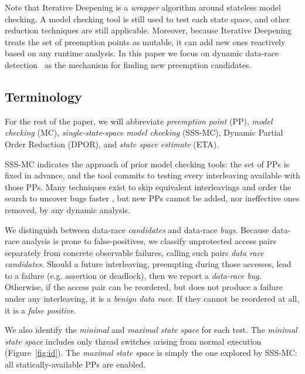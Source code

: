 Note that Iterative Deepening is a {\em wrapper} algorithm around stateless model checking.
A model checking tool is still used to test each state space, and other reduction techniques are still applicable.
Moreover, because Iterative Deepening treats the set of preemption points as mutable,
it can add new ones reactively based on any runtime analysis.
In this paper we focus on dynamic data-race detection~\cite{tsan} as the mechanism for finding new preemption candidates.

\subsection{Terminology}

For the rest of the paper, we will abbreviate {\em preemption point} (PP),
{\em model checking} (MC),
{\em single-state-space model checking} (SSS-MC), %
Dynamic Partial Order Reduction (DPOR), and {\em state space estimate} (ETA).

SSS-MC indicates the approach of prior model checking tools:
the set of PPs is fixed in advance, and the tool commits to testing every interleaving available with those PPs.
Many techniques exist to skip equivalent interleavings and order the search to uncover bugs faster \cite{dpor,demeter,chess-icb,gambit},
but new PPs cannot be added, nor ineffective ones removed, by any dynamic analysis.

We distinguish between data-race {\em candidates} and data-race {\em bugs}.
Because data-race analysis is prone to false-positives,
we classify unprotected access pairs separately from concrete observable failures, %
calling such pairs {\em data race candidates}.
Should a future interleaving, preempting during those accesses,
lead to a failure (e.g. assertion or deadlock), then we report a {\em data-race bug}.
Otherwise, if the access pair can be reordered, but does not produce a failure under any interleaving, it is a {\em benign data race}.
If they cannot be reordered at all, it is a {\em false positive}.

We also identify the {\em minimal} and {\em maximal state space} for each test.
The {\em minimal state space} includes only thread switches arising from normal execution (Figure~\ref{fig:id}).
The {\em maximal state space} is simply the one explored by SSS-MC: all statically-available PPs are enabled.

